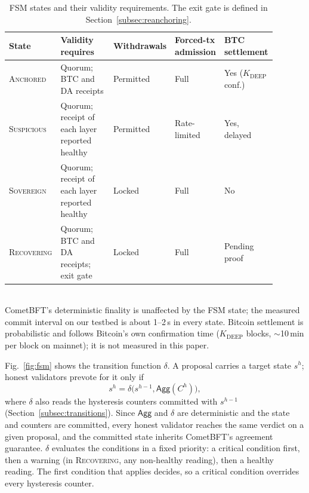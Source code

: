 \begin{table}[tbp]
\caption{FSM states and their validity requirements. The exit gate is defined
in Section~\ref{subsec:reanchoring}.}
\label{tab:fsm-states}
\centering
\footnotesize
\newcommand{\rcc}[1]{\raggedright\arraybackslash #1}
\begin{tabular}{@{}>{\rcc}p{0.12\linewidth}>{\rcc}p{0.31\linewidth}>{\rcc}p{0.13\linewidth}>{\rcc}p{0.15\linewidth}>{\rcc}p{0.18\linewidth}@{}}
\toprule
\textbf{State} & \textbf{Validity requires} & \textbf{Withdrawals} &
\textbf{Forced-tx admission} & \textbf{BTC settlement} \\
\midrule
\textsc{Anchored} & Quorum; BTC and DA receipts & Permitted & Full & Yes ($K_{\text{DEEP}}$ conf.) \\
\textsc{Suspicious} & Quorum; receipt of each layer reported healthy & Permitted & Rate-limited & Yes, delayed \\
\textsc{Sovereign} & Quorum; receipt of each layer reported healthy & Locked & Full & No \\
\textsc{Recovering} & Quorum; BTC and DA receipts; exit gate & Locked & Full & Pending proof \\
\bottomrule
\end{tabular}
\\[2pt]
\footnotesize CometBFT's deterministic finality is unaffected by the FSM state;
the measured commit interval on our testbed is about 1--2\,s in every state.
Bitcoin settlement is probabilistic and follows Bitcoin's own confirmation
time ($K_{\text{DEEP}}$ blocks, $\sim$10\,min per block on mainnet); it is
not measured in this paper.
\end{table}

Fig.~\ref{fig:fsm} shows the transition function $\delta$. A proposal
carries a target state $s^{h}$; honest validators prevote for it only if
\begin{equation}
s^{h} = \delta\bigl(s^{h-1}, \mathsf{Agg}(C^{h})\bigr),
\label{eq:delta}
\end{equation}
where $\delta$ also reads the hysteresis counters committed with $s^{h-1}$
(Section~\ref{subsec:transitions}). Since $\mathsf{Agg}$ and $\delta$ are
deterministic and the state and counters are committed, every honest
validator reaches the same verdict on a given proposal, and the committed
state inherits CometBFT's agreement guarantee. $\delta$ evaluates the
conditions in a fixed priority: a critical condition first, then a warning
(in \textsc{Recovering}, any non-healthy reading), then a healthy reading.
The first condition that applies decides, so a critical condition overrides
every hysteresis counter.


